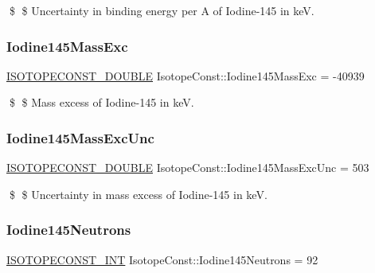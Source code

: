 \$ \$ Uncertainty in binding energy per A of Iodine-\/145 in keV. \mbox{\label{group___isotope_const-_iodine-_i145_gaa3583106a50250e7c514f4ed6eaf710d}} 
\subsubsection{\texorpdfstring{Iodine145\+Mass\+Exc}{Iodine145MassExc}}
{\footnotesize\ttfamily \mbox{\hyperlink{group___isotope_const-_macros_ga8f45a7272ce02c0b4c65c44636ed719a}{I\+S\+O\+T\+O\+P\+E\+C\+O\+N\+S\+T\+\_\+\+D\+O\+U\+B\+LE}} Isotope\+Const\+::\+Iodine145\+Mass\+Exc = -\/40939}

\$ \$ Mass excess of Iodine-\/145 in keV. \mbox{\label{group___isotope_const-_iodine-_i145_gac0e20bbd2ee10f7cf2b9816a4c1077e1}} 
\subsubsection{\texorpdfstring{Iodine145\+Mass\+Exc\+Unc}{Iodine145MassExcUnc}}
{\footnotesize\ttfamily \mbox{\hyperlink{group___isotope_const-_macros_ga8f45a7272ce02c0b4c65c44636ed719a}{I\+S\+O\+T\+O\+P\+E\+C\+O\+N\+S\+T\+\_\+\+D\+O\+U\+B\+LE}} Isotope\+Const\+::\+Iodine145\+Mass\+Exc\+Unc = 503}

\$ \$ Uncertainty in mass excess of Iodine-\/145 in keV. \mbox{\label{group___isotope_const-_iodine-_i145_ga98c708b0f66b0d1a351314b264bee606}} 
\subsubsection{\texorpdfstring{Iodine145\+Neutrons}{Iodine145Neutrons}}
{\footnotesize\ttfamily \mbox{\hyperlink{group___isotope_const-_macros_ga5f18360b3e99483a35c32d789e62621c}{I\+S\+O\+T\+O\+P\+E\+C\+O\+N\+S\+T\+\_\+\+I\+NT}} Isotope\+Const\+::\+Iodine145\+Neutrons = 92}


